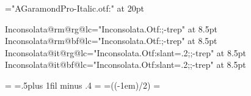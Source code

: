 \font\titlefont="AGaramondPro-Italic.otf:\fontfeatures" at 20pt

\def\codefont{%
    \def\currentfont{Inconsolata}%
    \csname\currentfont @\currentstyle @\currentweight @\currentcase\endcsname
  }
\expandafter\font\csname Inconsolata@rm@rg@lc\endcsname="Inconsolata.Otf:\fontfeatures;-trep" at 8.5pt
\expandafter\font\csname Inconsolata@rm@bf@lc\endcsname="Inconsolata.Otf:\fontfeatures;-trep" at 8.5pt
\expandafter\font\csname Inconsolata@it@rg@lc\endcsname="Inconsolata.Otf:slant=.2;\fontfeatures;-trep" at 8.5pt
\expandafter\font\csname Inconsolata@it@bf@lc\endcsname="Inconsolata.Otf:slant=.2;\fontfeatures;-trep" at 8.5pt

\def\it{%
  \def\currentstyle{it}%
  \makecurrentfont
  }
\def\bf{%
  \def\currentweight{bf}%
  \makecurrentfont
  }  
\def\sc{%
  \def\currentcase{sc}%
  \makecurrentfont
  }
\def\rm{%
  \def\currentstyle{rm}%
  \makecurrentfont
  }
\def\textit#1{{\it#1}}




\baselineskip=12pt
\topskip=\baselineskip
{}\baselineskip
\hsize=21pc
\parfillskip=.5\hsize plus 1fil minus .4\hsize
{}\hsize
\pdfpageheight=\pdfpagewidth
\pdfhorigin=\dimexpr((\hsize-1em)/2)
\pdfvorigin=\pdfhorigin
\parskip0pt \parindent0pt
\frenchspacing

\newbox\leftside
\newif\ifleftside \leftsidetrue
\output{%
  \ifleftside
    \global\setbox\leftside=\box255
    \global\leftsidefalse
  \else
    \global\leftsidetrue
    \shipout\hbox{%
        \box\leftside\kern1em\box255 
      }%
    \advancepageno
  \fi
  }




